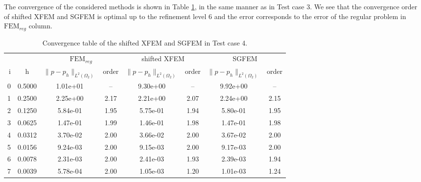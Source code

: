 The convergence of the considered methods is shown in Table \ref{tab:convergence_test4}, in the same manner as in Test case 3.
We see that the convergence order of shifted XFEM and SGFEM is optimal up to the refinement level 6 and the error corresponds to
the error of the regular problem in $\textrm{FEM}_{reg}$ column. 
%
\begin{table}[!htb]
\begin{center}
\bgroup
\def\arraystretch{1.2}
\setlength\tabcolsep{5pt}
\begin{tabular}{rc|cc|cc|cc}
\toprule
\multicolumn{2}{c|}{} & \multicolumn{2}{c|}{$\textrm{FEM}_{reg}$} & \multicolumn{2}{c|}{shifted XFEM} & \multicolumn{2}{c}{SGFEM}\\ [3pt] %
i & h & $\|p-p_h\|_{L^2(\Omega_2)}$ & order & $\|p-p_h\|_{L^2(\Omega_2)}$ & order & $\|p-p_h\|_{L^2(\Omega_2)}$ & order \\ [3pt] \midrule
0 & 0.5000 & 1.01e+01 & --   & 9.30e+00 & --   & 9.92e+00 & --   \\ %
1 & 0.2500 & 2.25e+00 & 2.17 & 2.21e+00 & 2.07 & 2.24e+00 & 2.15 \\ %
2 & 0.1250 & 5.84e-01 & 1.95 & 5.75e-01 & 1.94 & 5.80e-01 & 1.95 \\ %
3 & 0.0625 & 1.47e-01 & 1.99 & 1.46e-01 & 1.98 & 1.47e-01 & 1.98 \\ %
4 & 0.0312 & 3.70e-02 & 2.00 & 3.66e-02 & 2.00 & 3.67e-02 & 2.00 \\ %
5 & 0.0156 & 9.24e-03 & 2.00 & 9.15e-03 & 2.00 & 9.17e-03 & 2.00 \\ %
6 & 0.0078 & 2.31e-03 & 2.00 & 2.41e-03 & 1.93 & 2.39e-03 & 1.94 \\ %
7 & 0.0039 & 5.78e-04 & 2.00 & 1.05e-03 & 1.20 & 1.01e-03 & 1.24 \\ %
\bottomrule
\end{tabular}
\egroup
\caption[Convergence table in Test case 4.]
{Convergence table of the shifted XFEM and SGFEM in Test case 4.}
\label{tab:convergence_test4}
\end{center}
\end{table}

